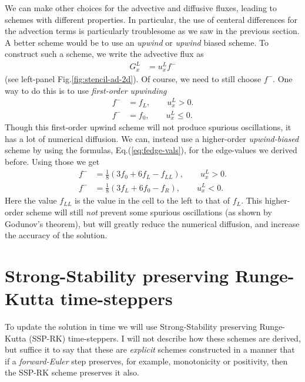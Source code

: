\documentclass[12pt]{article}
\theoremstyle{definition}
\theoremstyle{definition}
\theoremstyle{definition}
\newcommand{\eqr}[1]{Eq.\thinspace(#1)}
\begin{document}
We can make other choices for the advective and diffusive fluxes,
leading to schemes with different properties. In particular, the use
of centeral differences for the advection terms is particularly
troublesome as we saw in the previous section. A better scheme would
be to use an \emph{upwind} or \emph{upwind} biased scheme. To
construct such a scheme, we write the advective flux as
\begin{align}
  G_x^L &= u_x^L f^{-}
\end{align}
(see left-panel Fig.\thinspace\ref{fig:stencil-ad-2d}). Of course, we
need to still choose $f^{-}$. One way to do this is to use
\emph{first-order upwinding}
\begin{subequations}
\begin{align}
  f^{-} &= f_L, \qquad u_x^L > 0. \\
  f^{-} &= f_0, \qquad u_x^L \le 0.
\end{align}
\end{subequations}
Though this first-order upwind scheme will not produce spurious
oscillations, it has a lot of numerical diffusion. We can, instead use
a higher-order \emph{upwind-biased} scheme by using the formulas,
\eqr{\ref{eq:fedge-vals}}, for the edge-values we derived
before. Using those we get
\begin{subequations}
\begin{align}
  f^- &= \frac{1}{8} ( 3 f_{0} + 6 f_L - f_{LL} ), \qquad u_x^L > 0. \\
  f^- &= \frac{1}{8} ( 3 f_{L} + 6 f_0 - f_R ), \qquad u_x^L < 0.
\end{align}
\end{subequations}
Here the value $f_{LL}$ is the value in the cell to the left to that
of $f_L$. This higher-order scheme will still \emph{not} prevent some
spurious oscillations (as shown by Godunov's theorem), but will
greatly reduce the numerical diffusion, and increase the accuracy of
the solution.

\section{Strong-Stability preserving Runge-Kutta time-steppers}

To update the solution in time we will use Strong-Stability preserving
Runge-Kutta (SSP-RK) time-steppers. I will not describe how these
schemes are derived, but suffice it to say that these are
\emph{explicit} schemes constructed in a manner that if a
\emph{forward-Euler} step preserves, for example, monotonicity or
positivity, then the SSP-RK scheme preserves it also.
\end{document}
